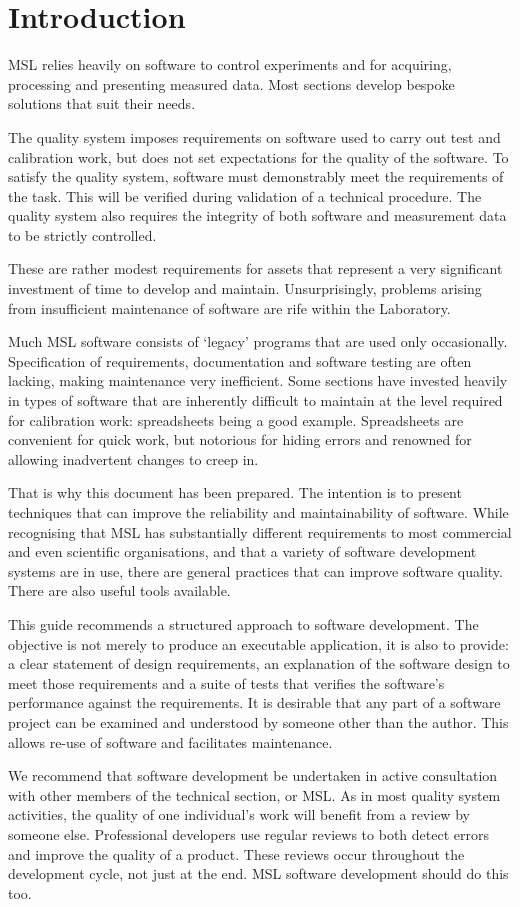 \section{Introduction}
MSL relies heavily on software to control experiments and for acquiring, processing and presenting measured data. Most sections develop bespoke solutions that suit their needs. 

The quality system imposes requirements on software used to carry out test and calibration work, but does not set expectations for the quality of the software. To satisfy the quality system, software must demonstrably meet the requirements of the task. This will be verified during validation of a technical procedure. The quality system also requires the integrity of both software and measurement data to be strictly controlled. 

These are rather modest requirements for assets that represent a very significant investment of time to develop and maintain.   Unsurprisingly, problems arising from insufficient maintenance of software are rife within the Laboratory. 

Much MSL software consists of `legacy' programs that are used only occasionally. Specification of requirements, documentation and software testing are often lacking, making maintenance very inefficient. Some sections have invested heavily in types of software that are inherently difficult to maintain at the level required for calibration work: spreadsheets being a good example. Spreadsheets are convenient for quick work, but notorious for hiding errors and renowned for allowing inadvertent changes to creep in.  

That is why this document has been prepared. The intention is to present techniques that can improve the reliability and maintainability of software. While recognising that MSL has substantially different requirements to most commercial and even scientific organisations, and that a variety of software development systems are in use, there are general practices that can improve software quality. There are also useful tools available. 

This guide recommends a structured approach to software development. The objective is not merely to produce an executable application, it is also to provide: a clear statement of design requirements, an explanation of the software design to meet those requirements and a suite of tests that verifies the software's performance against the requirements. It is desirable that any part of a software project can be examined and understood by someone other than the author. This allows re-use of software and facilitates maintenance. 

We recommend that software development be undertaken in active consultation with other members of the technical section, or MSL. As in most quality system activities, the quality of one individual's work will benefit from a review by someone else. Professional developers use regular reviews to both detect errors and improve the quality of a product. These reviews occur throughout the development cycle, not just at the end. MSL software development should do this too.  



